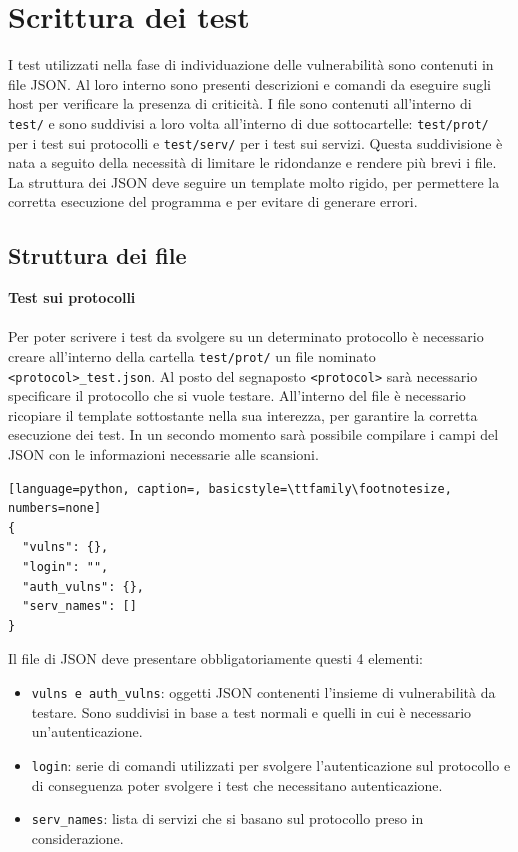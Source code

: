 \documentclass[12pt]{report}
\begin{document}
% 
% 

\chapter{Scrittura dei test}
\label{cap:scrittura-dei-test}

I test utilizzati nella fase di individuazione delle vulnerabilità sono contenuti in file JSON. Al loro interno sono presenti descrizioni e comandi da eseguire sugli host per verificare la presenza di criticità. I file sono contenuti all'interno di \lstinline{test/} e sono suddivisi a loro volta all'interno di due sottocartelle: \lstinline{test/prot/} per i test sui protocolli e \lstinline{test/serv/} per i test sui servizi. Questa suddivisione è nata a seguito della necessità di limitare le ridondanze e rendere più brevi i file. La struttura dei JSON deve seguire un template molto rigido, per permettere la corretta esecuzione del programma e per evitare di generare errori.  

\section{Struttura dei file}

\noindent
\textbf{Test sui protocolli}
\\\\
Per poter scrivere i test da svolgere su un determinato protocollo è necessario creare all'interno della cartella \lstinline{test/prot/} un file nominato \lstinline{<protocol>_test.json}. Al posto del segnaposto \lstinline{<protocol>} sarà necessario specificare il protocollo che si vuole testare. All'interno del file è necessario ricopiare il template sottostante nella sua interezza, per garantire la corretta esecuzione dei test. In un secondo momento sarà possibile compilare i campi del JSON con le informazioni necessarie alle scansioni.
\begin{lstlisting}[language=python, caption=, basicstyle=\ttfamily\footnotesize, numbers=none]
{
  "vulns": {},
  "login": "",
  "auth_vulns": {},
  "serv_names": []
}
\end{lstlisting}
Il file di JSON deve presentare obbligatoriamente questi 4 elementi:
\begin{itemize}
    \item \lstinline{vulns e auth_vulns}: oggetti JSON contenenti l'insieme di vulnerabilità da testare. Sono suddivisi in base a test normali e quelli in cui è necessario un'autenticazione.
    \item \lstinline{login}: serie di comandi utilizzati per svolgere l'autenticazione sul protocollo e di conseguenza poter svolgere i test che necessitano autenticazione.
    \item \lstinline{serv_names}: lista di servizi che si basano sul protocollo preso in considerazione.
\end{itemize}
\end{document}
